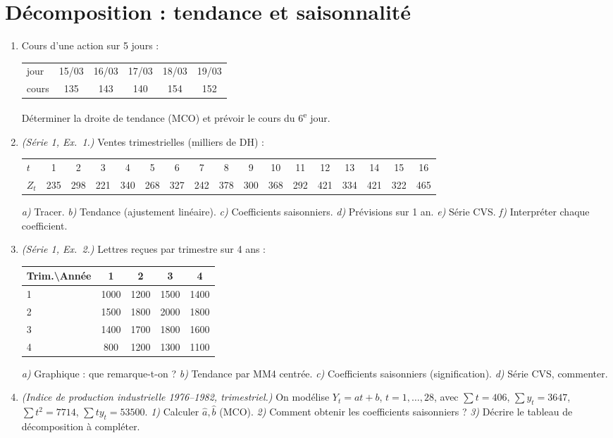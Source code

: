 \documentclass[11pt]{article}
\begin{document}
\section{Décomposition : tendance et saisonnalité}
\begin{enumerate}[label=\textbf{Q\,H.\arabic*},leftmargin=*]
\item Cours d'une action sur 5 jours :
\begin{center}\small
\begin{tabular}{lccccc}\toprule
jour&15/03&16/03&17/03&18/03&19/03\\ cours&135&143&140&154&152\\\bottomrule
\end{tabular}
\end{center}
Déterminer la droite de tendance (MCO) et prévoir le cours du 6\textsuperscript{e} jour.

\item \emph{(Série 1, Ex.~1.)} Ventes trimestrielles (milliers de DH) :
\begin{center}\scriptsize
\begin{tabular}{lcccccccccccccccc}\toprule
$t$&1&2&3&4&5&6&7&8&9&10&11&12&13&14&15&16\\
$Z_t$&235&298&221&340&268&327&242&378&300&368&292&421&334&421&322&465\\\bottomrule
\end{tabular}
\end{center}
\emph{a)} Tracer. \emph{b)} Tendance (ajustement linéaire). \emph{c)} Coefficients
saisonniers. \emph{d)} Prévisions sur 1 an. \emph{e)} Série CVS. \emph{f)} Interpréter chaque
coefficient.

\item \emph{(Série 1, Ex.~2.)} Lettres reçues par trimestre sur 4 ans :
\begin{center}\small
\begin{tabular}{lcccc}\toprule
Trim.\textbackslash Année&1&2&3&4\\\midrule
1&1000&1200&1500&1400\\ 2&1500&1800&2000&1800\\
3&1400&1700&1800&1600\\ 4&800&1200&1300&1100\\\bottomrule
\end{tabular}
\end{center}
\emph{a)} Graphique : que remarque-t-on ? \emph{b)} Tendance par MM4 centrée. \emph{c)}
Coefficients saisonniers (signification). \emph{d)} Série CVS, commenter.

\item \emph{(Indice de production industrielle 1976--1982, trimestriel.)} On modélise
$Y_t=at+b$, $t=1,\dots,28$, avec $\sum t=406$, $\sum y_t=3647$, $\sum t^2=7714$,
$\sum t y_t=53500$. \emph{1)} Calculer $\hat a,\hat b$ (MCO). \emph{2)} Comment obtenir les
coefficients saisonniers ? \emph{3)} Décrire le tableau de décomposition à compléter.
\end{enumerate}
\end{document}
